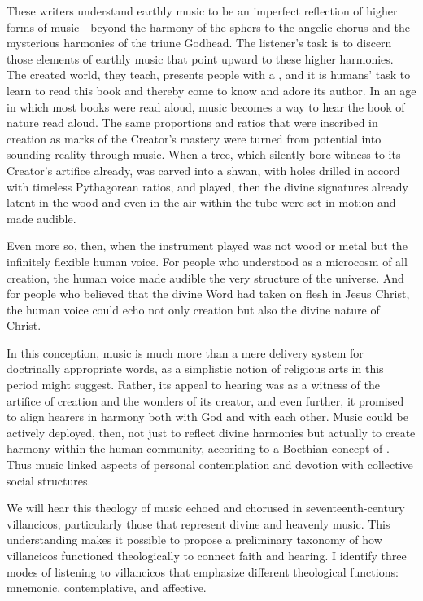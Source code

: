 \documentclass[tt]{vcbook-proposal}
\begin{document}
These writers understand earthly music to be an imperfect reflection of higher forms of music---beyond the harmony of the sphers to the angelic chorus and the mysterious harmonies of the triune Godhead. 
The listener's task is to discern those elements of earthly music that point upward to these higher harmonies.
The created world, they teach, presents people with a , and it is humans' task to learn to read this book and thereby come to know and adore its author.
In an age in which most books were read aloud, music becomes a way to hear the book of nature read aloud.
The same proportions and ratios that were inscribed in creation as marks of the Creator's mastery were turned from potential into sounding reality through music. 
When a tree, which silently bore witness to its Creator's artifice already, was carved into a shwan, with holes drilled in accord with timeless Pythagorean ratios, and played, then the divine signatures already latent in the wood and even in the air within the tube were set in motion and made audible.

Even more so, then, when the instrument played was not wood or metal but the infinitely flexible human voice.
For people who understood  as a microcosm of all creation, the human voice made audible the very structure of the universe.
And for people who believed that the divine Word had taken on flesh in Jesus Christ, the human voice could echo not only creation but also the divine nature of Christ.

In this conception, music is much more than a mere delivery system for doctrinally appropriate words, as a simplistic notion of religious arts in this period might suggest.
Rather, its appeal to hearing was as a witness of the artifice of creation and the wonders of its creator, and even further, it promised to align hearers in harmony both with God and with each other.
Music could be actively deployed, then, not just to reflect divine harmonies but actually to create harmony within the human community, accoridng to a Boethian concept of .
Thus music linked aspects of personal contemplation and devotion with collective social structures.

We will hear this theology of music echoed and chorused in seventeenth-century villancicos, particularly those that represent divine and heavenly music.
This understanding makes it possible to propose a preliminary taxonomy of how villancicos functioned theologically to connect faith and hearing. 
I identify three modes of listening to villancicos that emphasize different theological functions: mnemonic, contemplative, and affective.
\end{document}
